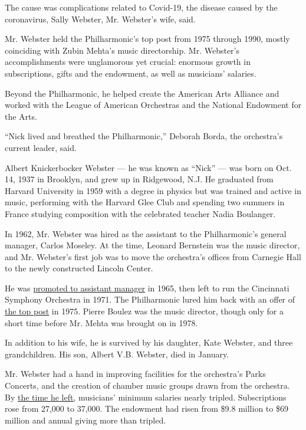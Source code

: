 The cause was complications related to Covid-19, the disease caused by
the coronavirus, Sally Webster, Mr. Webster's wife, said.

Mr. Webster held the Philharmonic's top post from 1975 through 1990,
mostly coinciding with Zubin Mehta's music directorship. Mr. Webster's
accomplishments were unglamorous yet crucial: enormous growth in
subscriptions, gifts and the endowment, as well as musicians' salaries.

Beyond the Philharmonic, he helped create the American Arts Alliance and
worked with the League of American Orchestras and the National Endowment
for the Arts.

``Nick lived and breathed the Philharmonic,'' Deborah Borda, the
orchestra's current leader, said.

Albert Knickerbocker Webster --- he was known as ``Nick'' --- was born
on Oct. 14, 1937 in Brooklyn, and grew up in Ridgewood, N.J. He
graduated from Harvard University in 1959 with a degree in physics but
was trained and active in music, performing with the Harvard Glee Club
and spending two summers in France studying composition with the
celebrated teacher Nadia Boulanger.

In 1962, Mr. Webster was hired as the assistant to the Philharmonic's
general manager, Carlos Moseley. At the time, Leonard Bernstein was the
music director, and Mr. Webster's first job was to move the orchestra's
offices from Carnegie Hall to the newly constructed Lincoln Center.

He was
\href{https://timesmachine.nytimes.com/timesmachine/1965/12/01/95917009.pdf?pdf_redirect=true\&ip=0}{promoted
to assistant manager} in 1965, then left to run the Cincinnati Symphony
Orchestra in 1971. The Philharmonic lured him back with an offer of
\href{https://www.nytimes.com/1975/03/01/archives/webster-of-cincinnati-to-head-philharmonic.html}{the
top post} in 1975. Pierre Boulez was the music director, though only for
a short time before Mr. Mehta was brought on in 1978.

In addition to his wife, he is survived by his daughter, Kate Webster,
and three grandchildren. His son, Albert V.B. Webster, died in January.

Mr. Webster had a hand in improving facilities for the orchestra's Parks
Concerts, and the creation of chamber music groups drawn from the
orchestra. By
\href{https://www.nytimes.com/1990/10/06/arts/administrator-quits-philharmonic.html}{the
time he left,} musicians' minimum salaries nearly tripled. Subscriptions
rose from 27,000 to 37,000. The endowment had risen from \$9.8 million
to \$69 million and annual giving more than tripled.

